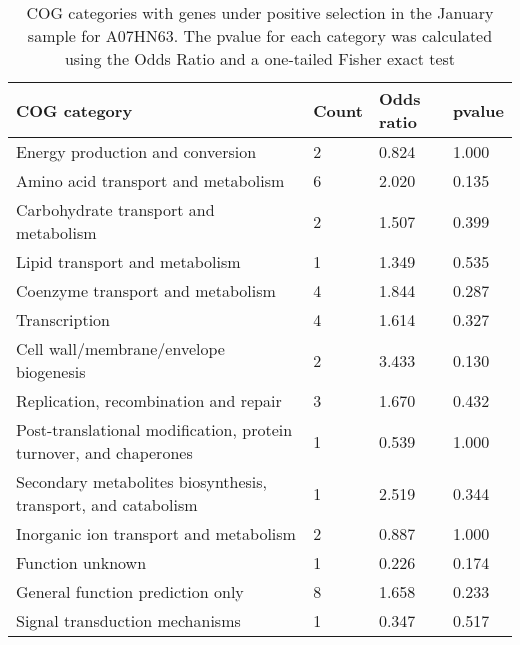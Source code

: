 \begin{table}[]
\footnotesize 
	\tabcolsep=0.11cm 
\caption{COG categories with genes under positive selection in the January sample for A07HN63. The pvalue for each category was calculated using the Odds Ratio and a one-tailed Fisher exact test \\} 
\begin{tabularx}{\textwidth}{L{6cm}R{2cm}R{2cm}R{2cm}} 
\hline 
\textbf{COG category} & \textbf{Count} & \textbf{Odds ratio} & \textbf{pvalue} \\ 
\hline 
Energy production and conversion & 2 & 0.824 & 1.000 \\ 
Amino acid transport and metabolism & 6 & 2.020 & 0.135 \\ 
Carbohydrate transport and metabolism & 2 & 1.507 & 0.399 \\ 
Lipid transport and metabolism & 1 & 1.349 & 0.535 \\ 
Coenzyme transport and metabolism & 4 & 1.844 & 0.287 \\ 
Transcription & 4 & 1.614 & 0.327 \\ 
Cell wall/membrane/envelope biogenesis & 2 & 3.433 & 0.130 \\ 
Replication, recombination and repair & 3 & 1.670 & 0.432 \\ 
Post-translational modification, protein turnover, and chaperones & 1 & 0.539 & 1.000 \\ 
Secondary metabolites biosynthesis, transport, and catabolism & 1 & 2.519 & 0.344 \\ 
Inorganic ion transport and metabolism & 2 & 0.887 & 1.000 \\ 
Function unknown & 1 & 0.226 & 0.174 \\ 
General function prediction only & 8 & 1.658 & 0.233 \\ 
Signal transduction mechanisms & 1 & 0.347 & 0.517 \\ 
\end{tabularx} 
\label{January_COG_Selection_A07HN63} 
 \end{table} 

